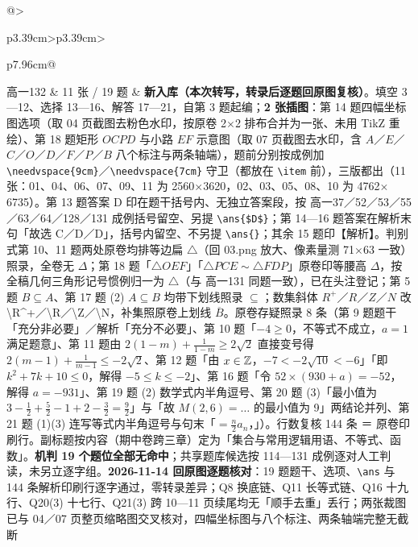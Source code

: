 \documentclass[a4paper,11pt]{article}
\begin{document}
\begin{xltabular}{\textwidth}{@{}>{\raggedright\arraybackslash}p{3.39cm}>{\centering\arraybackslash}p{3.39cm}>{\raggedright\arraybackslash}p{7.96cm}@{}}
高一132 & 11 张 / 19 题 & \textbf{新入库（本次转写，转录后逐题回原图复核）}。填空 3---12、选择 13---16、解答 17---21，自第 3 题起编；\textbf{2 张插图}：第 14 题四幅坐标图选项（取 04 页截图去粉色水印，按原卷 2$\times$2 排布合并为一张、未用 TikZ 重绘）、第 18 题矩形 \(OCPD\) 与小路 \(EF\) 示意图（取 07 页截图去水印，含 \(A\)／\(E\)／\(C\)／\(O\)／\(D\)／\(F\)／\(P\)／\(B\) 八个标注与两条轴端），题前分别按成例加 \texttt{\textbackslash{}needvspace\{9cm\}}／\texttt{\textbackslash{}needvspace\{7cm\}} 守卫（都放在 \texttt{\textbackslash{}item} 前），三版都出（11 张：01、04、06、07、09、11 为 2560$\times$3620，02、03、05、08、10 为 4762$\times$6735）。第 13 题答案 D 印在题干括号内、无独立答案段，按 高一37／52／53／55／63／64／128／131 成例括号留空、另提 \texttt{\textbackslash{}ans\{\$D\$\}}；第 14---16 题答案在解析末句「故选 C／D／D」，括号内留空、不另提 \texttt{\textbackslash{}ans\{\}}；其余 15 题印【解析】。判别式第 10、11 题两处原卷均排等边扁 \(\triangle\)（回 03.png 放大、像素量测 71$\times$63 一致）照录，全卷无 \(\Delta\)；第 18 题「\(\triangle OEF\)」「\(\triangle PCE\sim\triangle FDP\)」原卷印等腰高 \(\Delta\)，按全稿几何三角形记号惯例归一为 \(\triangle\)（与 高一131 同题一致），已在头注登记；第 5 题 \(B\subseteq\allowbreak  A\)、第 17 题 (2) \(A\subseteq\allowbreak  B\) 均带下划线照录 \(\subseteq\allowbreak \)；数集斜体 \(R^+\allowbreak \)／\(R\)／\(Z\)／\(N\) 改 \textbackslash R\^{}+／\textbackslash R／\textbackslash Z／\textbackslash N，补集照原卷上划线 \(\overline{B}\)。原卷存疑照录 8 条（第 9 题题干「充分非必要」／解析「充分不必要」、第 10 题「\(-4\geq0\)，不等式不成立，\(a=\allowbreak 1\) 满足题意」、第 11 题由 \(2(1-m)+\allowbreak \frac1{1-m}\geq2\sqrt2\) 直接变号得 \(2(m-1)+\allowbreak \frac1{m-1}\leq-2\sqrt2\)、第 12 题「由 \(x\in\mathbb{Z}\)，\(-7<-2\sqrt{10}<-6\)」「即 \(k^2+\allowbreak 7k+\allowbreak 10\leq0\)，解得 \(-5\leq k\leq-2\)」、第 16 题「令 \(52\times\allowbreak (930+a)=\allowbreak -52\)，解得 \(a=\allowbreak -931\)」、第 19 题 (2) 数学式内半角逗号、第 20 题 (3)「最小值为 \(3-\frac12+\allowbreak \frac52-1+\allowbreak 2-\frac32=\allowbreak \frac92\)」与「故 \(M(2,\allowbreak 6)=\allowbreak \dots\) 的最小值为 9」两结论并列、第 21 题 (1)(3) 连写等式内半角逗号与句末「\(=\allowbreak \frac n2 a_n\)，」）。行数复核 144 条 ＝ 原卷印刷行。副标题按内容（期中卷跨三章）定为「集合与常用逻辑用语、不等式、函数」。\textbf{机判 19 个题位全部无命中}；共享题库候选按 114---131 成例逐对人工判读，未另立逐字组。\textbf{2026-11-14 回原图逐题核对}：19 题题干、选项、\texttt{\textbackslash{}ans} 与 144 条解析印刷行逐字通过，零转录差异；Q8 换底链、Q11 长等式链、Q16 十九行、Q20(3) 十七行、Q21(3) 跨 10---11 页续尾均无「顺手去重」丢行；两张裁图已与 04／07 页整页缩略图交叉核对，四幅坐标图与八个标注、两条轴端完整无截断 \\ \addlinespace[1pt]

\end{xltabular}
\end{document}
